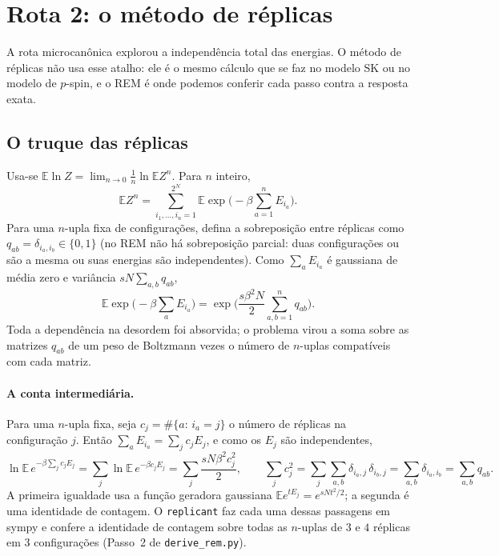 \documentclass[11pt,a4paper]{article}
\newcommand{\E}{\mathbb{E}}
\begin{document}
\section{Rota 2: o método de réplicas}
\label{sec:replicas}

A rota microcanônica explorou a independência total das energias. O método de réplicas não usa esse
atalho: ele é o mesmo cálculo que se faz no modelo SK ou no modelo de $p$-spin, e o REM é onde podemos
conferir cada passo contra a resposta exata.

\subsection{O truque das réplicas}
Usa-se $\E\ln Z=\lim_{n\to0}\frac{1}{n}\ln\E Z^n$. Para $n$ inteiro,
\begin{equation}
  \E Z^n=\sum_{i_1,\dots,i_n=1}^{2^N}\E\exp\Big(-\beta\sum_{a=1}^n E_{i_a}\Big).
\end{equation}
Para uma $n$-upla fixa de configurações, defina a sobreposição entre réplicas como
$q_{ab}=\delta_{i_a,i_b}\in\{0,1\}$ (no REM não há sobreposição parcial: duas configurações ou são a mesma
ou suas energias são independentes). Como $\sum_aE_{i_a}$ é gaussiana de média zero e variância
$sN\sum_{a,b}q_{ab}$,
\begin{equation}
  \E\exp\Big(-\beta\sum_aE_{i_a}\Big)=\exp\Big(\frac{s\beta^2N}{2}\sum_{a,b=1}^nq_{ab}\Big).
  \label{eq:media-gauss}
\end{equation}
Toda a dependência na desordem foi absorvida; o problema virou a soma sobre as matrizes $q_{ab}$ de
um peso de Boltzmann vezes o número de $n$-uplas compatíveis com cada matriz.

\paragraph{A conta intermediária.} Para uma $n$-upla fixa, seja $c_j=\#\{a:\,i_a=j\}$ o número de
réplicas na configuração $j$. Então $\sum_aE_{i_a}=\sum_jc_jE_j$, e como os $E_j$ são independentes,
\[
  \ln\E\,e^{-\beta\sum_jc_jE_j}=\sum_j\ln\E\,e^{-\beta c_jE_j}=\sum_j\frac{sN\beta^2c_j^2}{2},
  \qquad
  \sum_jc_j^2=\sum_j\sum_{a,b}\delta_{i_a,j}\,\delta_{i_b,j}=\sum_{a,b}\delta_{i_a,i_b}=\sum_{a,b}q_{ab}.
\]
A primeira igualdade usa a função geradora gaussiana $\E e^{tE_j}=e^{sNt^2/2}$; a segunda é uma
identidade de contagem. O \texttt{replicant} faz cada uma dessas passagens em sympy e confere a
identidade de contagem sobre todas as $n$-uplas de $3$ e $4$ réplicas em $3$ configurações
(Passo~2 de \texttt{derive\_rem.py}).
\end{document}
